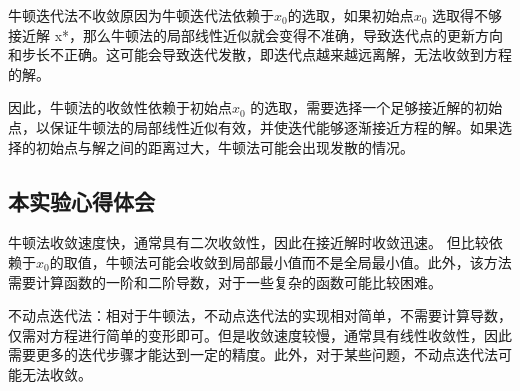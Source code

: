 \documentclass[12pt, a4paper, oneside]{ctexart}
\begin{document}
\indent

  牛顿迭代法不收敛原因为牛顿迭代法依赖于$x_0$的选取，如果初始点$ x_0$ 选取得不够接近解 x*，那么牛顿法的局部线性近似就会变得不准确，导致迭代点的更新方向和步长不正确。这可能会导致迭代发散，即迭代点越来越远离解，无法收敛到方程的解。



  因此，牛顿法的收敛性依赖于初始点$ x_0$ 的选取，需要选择一个足够接近解的初始点，以保证牛顿法的局部线性近似有效，并使迭代能够逐渐接近方程的解。如果选择的初始点与解之间的距离过大，牛顿法可能会出现发散的情况。

	\subsection{本实验心得体会}

  牛顿法收敛速度快，通常具有二次收敛性，因此在接近解时收敛迅速。
但比较依赖于$x_0$的取值，牛顿法可能会收敛到局部最小值而不是全局最小值。此外，该方法需要计算函数的一阶和二阶导数，对于一些复杂的函数可能比较困难。

  不动点迭代法：相对于牛顿法，不动点迭代法的实现相对简单，不需要计算导数，仅需对方程进行简单的变形即可。但是收敛速度较慢，通常具有线性收敛性，因此需要更多的迭代步骤才能达到一定的精度。此外，对于某些问题，不动点迭代法可能无法收敛。
\end{document}
